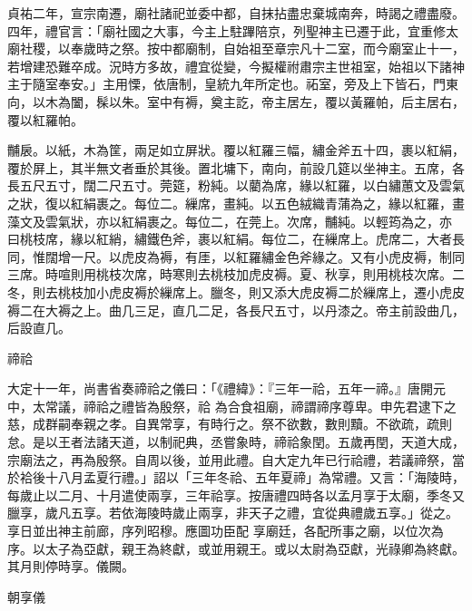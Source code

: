\begin{pinyinscope}
 貞祐二年，宣宗南遷，廟社諸祀並委中都，自抹拈盡忠棄城南奔，時謁之禮盡廢。四年，禮官言：「廟社國之大事，今主上駐蹕陪京，列聖神主已遷于此，宜重修太廟社稷，以奉歲時之祭。按中都廟制，自始祖至章宗凡十二室，而今廟室止十一，若增建恐難卒成。況時方多故，禮宜從變，今擬權祔肅宗主世祖室，始祖以下諸神
 主于隨室奉安。」主用慄，依唐制，皇統九年所定也。祏室，旁及上下皆石，門東向，以木為闔，髹以朱。室中有褥，奠主訖，帝主居左，覆以黃羅帕，后主居右，覆以紅羅帕。



 黼扆。以紙，木為筐，兩足如立屏狀。覆以紅羅三幅，繡金斧五十四，裹以紅絹，覆於屏上，其半無文者垂於其後。置北墉下，南向，前設几筵以坐神主。五席，各長五尺五寸，闊二尺五寸。莞筵，粉純。以藺為席，緣以紅羅，以白繡蕙文及雲氣之狀，復以紅絹裹之。每位二。繅席，畫純。以五色絨織青蒲為之，緣以紅羅，畫藻文及雲氣狀，亦以紅絹裹之。每位二，在莞上。次席，黼純。以輕筠為之，亦
 曰桃枝席，緣以紅綃，繡鐵色斧，裹以紅絹。每位二，在繅席上。虎席二，大者長同，惟闊增一尺。以虎皮為褥，有厓，以紅羅繡金色斧緣之。又有小虎皮褥，制同三席。時喧則用桃枝次席，時寒則去桃枝加虎皮褥。夏、秋享，則用桃枝次席。二冬，則去桃枝加小虎皮褥於繅席上。臘冬，則又添大虎皮褥二於繅席上，遷小虎皮褥二在大褥之上。曲几三足，直几二足，各長尺五寸，以丹漆之。帝主前設曲几，后設直几。



 禘祫



 大定十一年，尚書省奏禘祫之儀曰：「《禮緯》：『三年一祫，五年一禘。』唐開元中，太常議，禘祫之禮皆為殷祭，祫
 為合食祖廟，禘謂禘序尊卑。申先君逮下之慈，成群嗣奉親之孝。自異常享，有時行之。祭不欲數，數則黷。不欲疏，疏則怠。是以王者法諸天道，以制祀典，丞嘗象時，禘祫象閏。五歲再閏，天道大成，宗廟法之，再為殷祭。自周以後，並用此禮。自大定九年已行祫禮，若議禘祭，當於袷後十八月孟夏行禮。」詔以「三年冬祫、五年夏禘」為常禮。又言：「海陵時，每歲止以二月、十月遣使兩享，三年祫享。按唐禮四時各以孟月享于太廟，季冬又臘享，歲凡五享。若依海陵時歲止兩享，非天子之禮，宜從典禮歲五享。」從之。享日並出神主前廊，序列昭穆。應圖功臣配
 享廟廷，各配所事之廟，以位次為序。以太子為亞獻，親王為終獻，或並用親王。或以太尉為亞獻，光祿卿為終獻。其月則停時享。儀闕。



 朝享儀




\end{pinyinscope}
